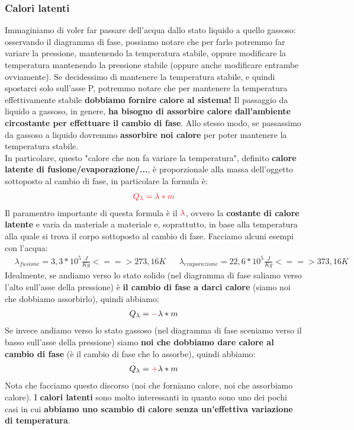         \subsubsection{Calori latenti}
            Immaginiamo di voler far passare dell'acqua dallo stato liquido a quello gassoso: osservando il diagramma di fase, possiamo notare che per farlo potremmo far variare la pressione, mantenendo la temperatura stabile, oppure modificare la temperatura mantenendo la pressione stabile (oppure anche modificare entrambe ovviamente). Se decidessimo di mantenere la temperatura stabile, e quindi spostarci solo sull'asse P, potremmo notare che per mantenere la temperatura effettivamente stabile \textbf{dobbiamo fornire calore al sistema!} Il passaggio da liquido a gassoso, in genere, \textbf{ha bisogno di assorbire calore dall'ambiente circostante per effettuare il cambio di fase}. Allo stesso modo, se passassimo da gassoso a liquido dovremmo \textbf{assorbire noi calore} per poter mantenere la temperatura stabile.\\
            In particolare, questo "calore che non fa variare la temperatura", definito \textbf{calore latente di fusione/evaporazione/...}, è proporzionale alla massa dell'oggetto sottoposto al cambio di fase, in particolare la formula è:
            \begin{align*}
                \textcolor{Red}{Q_\lambda=\lambda*m}
            \end{align*}
            Il paramentro importante di questa formula è il $\textcolor{Red}{\lambda}$, ovvero la \textbf{costante di calore latente} e varia da materiale a materiale e, soprattutto, in base alla temperatura alla quale si trova il corpo sottoposto al cambio di fase. Facciamo alcuni esempi con l'acqua:
            \begin{align*}
                & \lambda_{fusione} = 3,3 *10^5\frac{J}{Kg} <==> 273,16 K && \lambda_{evaporazione} = 22,6 *10^5\frac{J}{Kg} <==> 373,16 K
            \end{align*}
            Idealmente, se andiamo verso lo stato solido (nel diagramma di fase saliamo verso l'alto sull'asse della pressione) è \textbf{il cambio di fase a darci calore} (siamo noi che dobbiamo assorbirlo), quindi abbiamo:
            \begin{align*}
                Q_\lambda=\textcolor{Red}{-}\lambda*m
            \end{align*}
            Se invece andiamo verso lo stato gassoso (nel diagramma di fase sceniamo verso il basso sull'asse della pressione) siamo \textbf{noi che dobbiamo dare calore al cambio di fase} (è il cambio di fase che lo assorbe), quindi abbiamo:
            \begin{align*}
                Q_\lambda=\textcolor{Red}{+}\lambda*m
            \end{align*}
            Nota che facciamo questo discorso (noi che forniamo calore, noi che assorbiamo calore). I \textbf{calori latenti} sono molto interessanti in quanto sono uno dei pochi casi in cui \textbf{abbiamo uno scambio di calore senza un'effettiva variazione di temperatura}.

